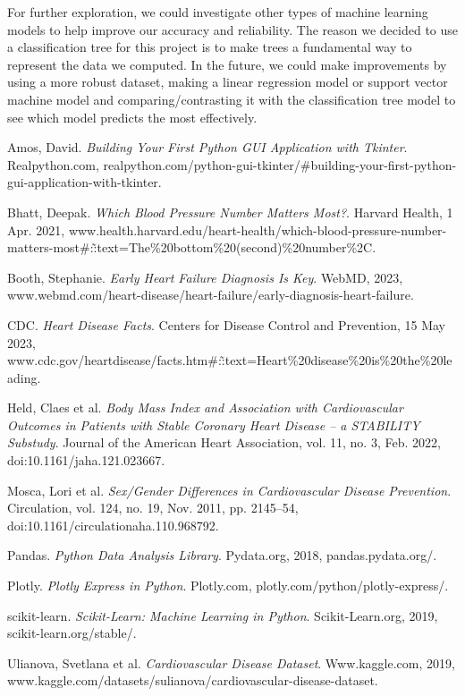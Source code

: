 ﻿\documentclass[12pt]{article}
\begin{document}
For further exploration, we could investigate other types of machine learning models to help improve our accuracy and reliability. The reason we decided to use a classification tree for this project is to make trees a fundamental way to represent the data we computed. In the future, we could make improvements by using a more robust dataset, making a linear regression model or support vector machine model and comparing/contrasting it with the classification tree model to see which model predicts the most effectively. 


\begin{thebibliography}{9}

Amos, David. 
\textit{Building Your First Python GUI Application with Tkinter}. 
Realpython.com, realpython.com/python-gui-tkinter/\#building-your-first-python-gui-application-with-tkinter.

Bhatt, Deepak.
\textit{Which Blood Pressure Number Matters Most?}.
Harvard Health, 1 Apr. 2021, www.health.harvard.edu/heart-health/which-blood-pressure-number-matters-most\#:\~:text=The\%20bottom\%20(second)\%20number\%2C.

Booth, Stephanie.
\textit{Early Heart Failure Diagnosis Is Key}.
WebMD, 2023, www.webmd.com/heart-disease/heart-failure/early-diagnosis-heart-failure.

CDC.
\textit{Heart Disease Facts}.
Centers for Disease Control and Prevention, 15 May 2023, www.cdc.gov/heartdisease/facts.htm\#:\~:text=Heart\%20disease\%20is\%20the\%20leading.

Held, Claes et al.
\textit{Body Mass Index and Association with Cardiovascular Outcomes in Patients with Stable Coronary Heart Disease – a STABILITY Substudy}.
Journal of the American Heart Association, vol. 11, no. 3, Feb. 2022, doi:10.1161/jaha.121.023667.

Mosca, Lori et al.
\textit{Sex/Gender Differences in Cardiovascular Disease Prevention}.
Circulation, vol. 124, no. 19, Nov. 2011, pp. 2145–54, doi:10.1161/circulationaha.110.968792.

Pandas.
\textit{Python Data Analysis Library}.
Pydata.org, 2018, pandas.pydata.org/.

Plotly.
\textit{Plotly Express in Python}.
Plotly.com, plotly.com/python/plotly-express/.

scikit-learn.
\textit{Scikit-Learn: Machine Learning in Python}.
Scikit-Learn.org, 2019, scikit-learn.org/stable/.

Ulianova, Svetlana et al.
\textit{Cardiovascular Disease Dataset}.
Www.kaggle.com, 2019, www.kaggle.com/datasets/sulianova/cardiovascular-disease-dataset.

\end{thebibliography}
\end{document}
